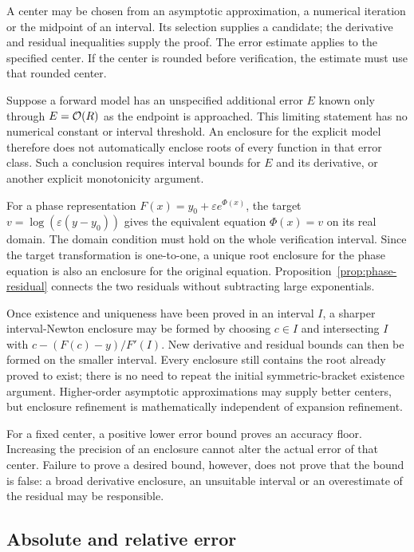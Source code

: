 A center may be chosen from an asymptotic approximation, a numerical
iteration or the midpoint of an interval. Its selection supplies a
candidate; the derivative and residual inequalities supply the proof.
The error estimate applies to the specified center. If the center is
rounded before verification, the estimate must use that rounded center.

Suppose a forward model has an unspecified additional error $E$ known only
through $E=\mathcal O(R)$ as the endpoint is approached. This limiting statement
has no numerical constant or interval threshold. An enclosure for the
explicit model therefore does not automatically enclose roots of every
function in that error class. Such a conclusion requires interval bounds
for $E$ and its derivative, or another explicit monotonicity argument.

For a phase representation $F(x)=y_0+\varepsilon e^{\Phi(x)}$, the target
$v=\log(\varepsilon(y-y_0))$ gives the equivalent equation
$\Phi(x)=v$ on its real domain. The domain condition must hold on the whole
verification interval. Since the target transformation is one-to-one,
a unique root enclosure for the phase equation is also an enclosure for
the original equation. Proposition~\ref{prop:phase-residual} connects the
two residuals without subtracting large exponentials.

Once existence and uniqueness have been proved in an interval $I$, a
sharper interval-Newton enclosure may be formed by choosing $c\in I$ and
intersecting $I$ with $c-(F(c)-y)/F'(I)$. New derivative and residual
bounds can then be formed on the smaller interval. Every enclosure still
contains the root already proved to exist; there is no need to repeat the
initial symmetric-bracket existence argument. Higher-order asymptotic
approximations may supply better centers, but enclosure refinement is
mathematically independent of expansion refinement.

For a fixed center, a positive lower error bound proves an accuracy
floor. Increasing the precision of an enclosure cannot alter the actual
error of that center. Failure to prove a desired bound, however, does not
prove that the bound is false: a broad derivative enclosure, an unsuitable
interval or an overestimate of the residual may be responsible.

\subsection{Absolute and relative error}

